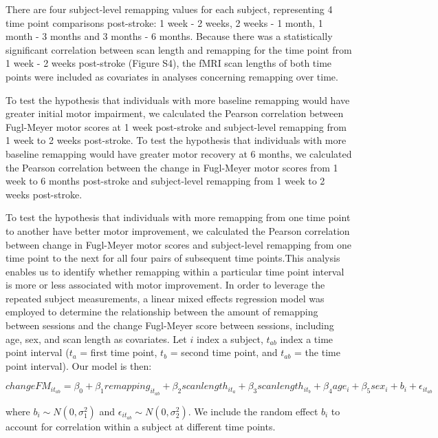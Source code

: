 \documentclass[phd,tocprelim]{cornell}
\begin{document}
	There are four subject-level remapping values for each subject, representing 4 time point comparisons post-stroke: 1 week - 2 weeks, 2 weeks - 1 month, 1 month - 3 months and 3 months - 6 months. Because there was a statistically significant correlation between scan length and remapping for the time point from 1 week - 2 weeks post-stroke (Figure S4), the fMRI scan lengths of both time points were included as covariates in analyses concerning remapping over time. 
	
	To test the hypothesis that individuals with more baseline remapping would have greater initial motor impairment, we calculated the Pearson correlation between Fugl-Meyer motor scores at 1 week post-stroke and subject-level remapping from 1 week to 2 weeks post-stroke. To test the hypothesis that individuals with more baseline remapping would have greater motor recovery at 6 months, we calculated the Pearson correlation between the change in Fugl-Meyer motor scores from 1 week to 6 months post-stroke and subject-level remapping from 1 week to 2 weeks post-stroke. 
	
	To test the hypothesis that individuals with more remapping from one time point to another have better motor improvement, we calculated the Pearson correlation between change in Fugl-Meyer motor scores and subject-level remapping from one time point to the next for all four pairs of subsequent time points.This analysis enables us to identify whether remapping within a particular time point interval is more or less associated with motor improvement. In order to leverage the repeated subject measurements, a linear mixed effects regression model was employed to determine the relationship between the amount of remapping between sessions and the change Fugl-Meyer score between sessions, including age, sex, and scan length as covariates.  Let $i$ index a subject, $t_{ab}$ index a time point interval ($t_a$ = first time point, $t_b$ = second time point, and  $t_{ab}$ = the time point interval). Our model is then: 
	\begin{center}
	\begin{equation}
	changeFM_{it_{ab}} =  \beta_0 + \beta_1 remapping_{it_{ab}} + \beta_2 scan length_{it_a} +\beta_3 scan length_{it_b} + \beta_4 age_i + \beta_5 sex_i + b_i + \epsilon_{it_{ab}}
	\end{equation}
	\end{center}
	\noindent where $b_i \sim N(0, \sigma_1^2)$ and $\epsilon_{it_{ab}} \sim N(0, \sigma_2^2)$.  We include the random effect $b_i$ to account for correlation within a subject at different time points. 
\end{document}

